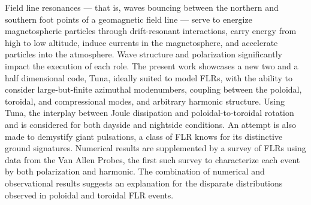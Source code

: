 
Field line resonances --- that is, \Alfven waves bouncing between the northern
and southern foot points of a geomagnetic field line --- serve to energize
magnetospheric particles through drift-resonant interactions, carry energy from
high to low altitude, induce currents in the magnetosphere, and accelerate
particles into the atmosphere. Wave structure and polarization significantly
impact the execution of each role. The present work showcases a new two and a
half dimensional code, Tuna, ideally suited to model FLRs, with the ability to
consider large-but-finite azimuthal modenumbers, coupling between the poloidal,
toroidal, and compressional modes, and arbitrary harmonic structure. Using
Tuna, the interplay between Joule dissipation and poloidal-to-toroidal rotation
and is considered for both dayside and nightside conditions. An attempt is also
made to demystify giant pulsations, a class of FLR knows for its distinctive
ground signatures. Numerical results are supplemented by a survey of 
FLRs using data from the Van Allen Probes, the first such survey to
characterize each event by both polarization and harmonic. The combination of
numerical and observational results suggests an explanation for the disparate
distributions observed in poloidal and toroidal FLR events. 



